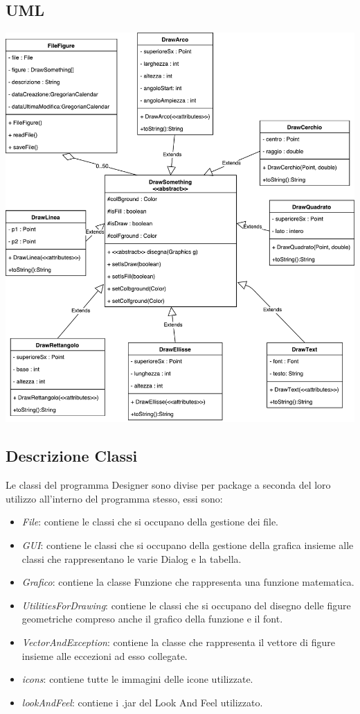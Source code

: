 \documentclass[a4paper,12pt,times,numbered,print,index]{article}
\begin{document}
\subsection{UML}
\begin{center}
	\includegraphics[scale=0.4]{Immagini/UML.pdf}
	\label{UML}
\end{center}


\subsection{Descrizione Classi}
Le classi del programma Designer sono divise per package a seconda del loro utilizzo all'interno del programma stesso, essi sono:
\begin{itemize}
	\item \textit{File}: contiene le classi che si occupano della gestione dei file.
	\item \textit{GUI}: contiene le classi che si occupano della gestione della grafica insieme alle classi che rappresentano le varie Dialog e la tabella.
	\item \textit{Grafico}: contiene la classe Funzione che rappresenta una funzione matematica.
	\item \textit{UtilitiesForDrawing}: contiene le classi che si occupano del disegno delle figure geometriche compreso anche il grafico della funzione e il font.
	\item \textit{VectorAndException}: contiene la classe che rappresenta il vettore di figure insieme alle eccezioni ad esso collegate.
	\item \textit{icons}: contiene tutte le immagini delle icone utilizzate.
	\item \textit{lookAndFeel}: contiene i .jar del Look And Feel utilizzato.
\end{itemize}
\end{document}
